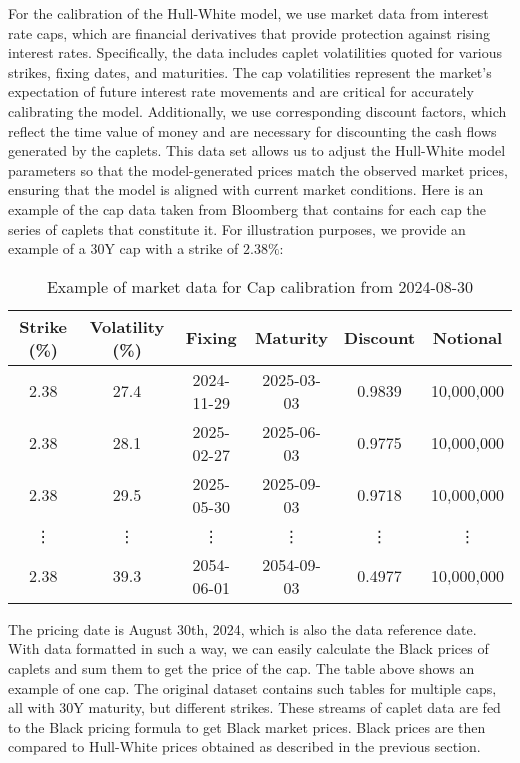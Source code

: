 \documentclass[titlepage, 12pt]{article}
\begin{document}
	For the calibration of the Hull-White model, we use market data from interest rate caps, which are financial derivatives that provide protection against rising interest rates. Specifically, the data includes caplet volatilities quoted for various strikes, fixing dates, and maturities. The cap volatilities represent the market's expectation of future interest rate movements and are critical for accurately calibrating the model. Additionally, we use corresponding discount factors, which reflect the time value of money and are necessary for discounting the cash flows generated by the caplets. This data set allows us to adjust the Hull-White model parameters so that the model-generated prices match the observed market prices, ensuring that the model is aligned with current market conditions. Here is an example of the cap data taken from Bloomberg that contains for each cap the series of caplets that constitute it. For illustration purposes, we provide an example of a 30Y cap with a strike of $2.38\%$:
	
	\begin{table}[H]
		\centering
		\caption{Example of market data for Cap calibration from 2024-08-30}
		\begin{tabular}{cccccc}
			\toprule
			\textbf{Strike (\%)} & \textbf{Volatility (\%)} & \textbf{Fixing} & \textbf{Maturity} & \textbf{Discount} & \textbf{Notional}\\
			\midrule
			2.38 & 27.4 & 2024-11-29 & 2025-03-03 & 0.9839 & 10,000,000 \\
			2.38 & 28.1 & 2025-02-27 & 2025-06-03 & 0.9775 & 10,000,000 \\
			2.38 & 29.5 & 2025-05-30 & 2025-09-03 & 0.9718 & 10,000,000 \\
			\vdots & \vdots & \vdots & \vdots & \vdots & \vdots \\
			2.38 & 39.3 & 2054-06-01 & 2054-09-03 & 0.4977 & 10,000,000\\
			\bottomrule
		\end{tabular}
	\end{table}
	
	The pricing date is August 30th, 2024, which is also the data reference date. With data formatted in such a way, we can easily calculate the Black prices of caplets and sum them to get the price of the cap. The table above shows an example of one cap. The original dataset contains such tables for multiple caps, all with 30Y maturity, but different strikes. These streams of caplet data are fed to the Black pricing formula to get Black market prices. Black prices are then compared to Hull-White prices obtained as described in the previous section.
	
\end{document}
